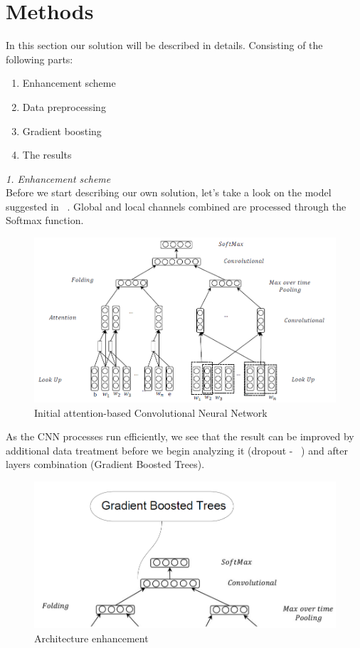 \documentclass[jou,apacite]{apa6}
\begin{document}
\section{Methods}
In this section our solution will be described in details. 
Consisting of the following parts:

\begin{enumerate}[itemsep=0mm]
    \item Enhancement scheme
    \item Data preprocessing
    \item Gradient boosting
    \item The results \\
\end{enumerate} 

\emph{\large{1. Enhancement scheme}}\\
Before we start describing our own solution, let's take a look on the model suggested in ~\cite{Gong}. Global and local channels combined are processed through the Softmax function. 
\begin{figure}
    \centering
    \includegraphics[scale=0.4]{Scheme.PNG}
    \caption{Initial attention-based Convolutional Neural Network}
    \label{fig:my_label}
\end{figure}

As the CNN processes run efficiently, we see that the result can be improved by additional data treatment before we begin analyzing it (dropout - ~\cite{Drop}) and after layers combination (Gradient Boosted Trees). \\

\begin{figure}
    \centering
    \includegraphics[scale=0.3]{123.PNG}
    \caption{Architecture enhancement}
    \label{fig:my_label}
\end{figure}
\end{document}
